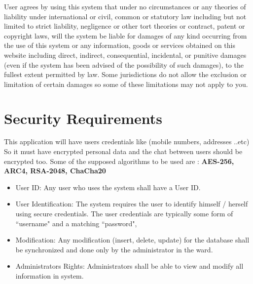 \documentclass{scrreprt}
\begin{document}
User agrees by using this system that under no circumstances or any theories of liability under international or civil, common or statutory law including but not limited to strict liability, negligence or other tort theories or contract, patent or copyright laws, will the system be liable for damages of any kind occurring from the use of this system or any information, goods or services obtained on this website including direct, indirect, consequential, incidental, or punitive damages (even if the system has been advised of the possibility of such damages), to the fullest extent permitted by law. Some jurisdictions do not allow the exclusion or limitation of certain damages so some of these limitations may not apply to you.




\section{Security Requirements}
This application will have users credentials like (mobile numbers, addresses ..etc)
So it must have encrypted personal data and the chat between users should be encrypted too.
Some of the supposed algorithms to be used are : \textbf{AES-256, ARC4, RSA-2048, ChaCha20}\\


\hrulefill

\begin{itemize}

    \item User ID: Any user who uses the system shall have a User ID.
    \item User Identification: The system requires the user to identify himself / herself using secure credentials. The user credentials are typically some form of ``username" and a matching ``password", 

\item  Modification: Any modification (insert, delete, update) for the database shall be synchronized and done only by the administrator in the ward.
\item Administrators Rights: Administrators shall be able to view and modify all information in system.
\end{itemize}
\end{document}
